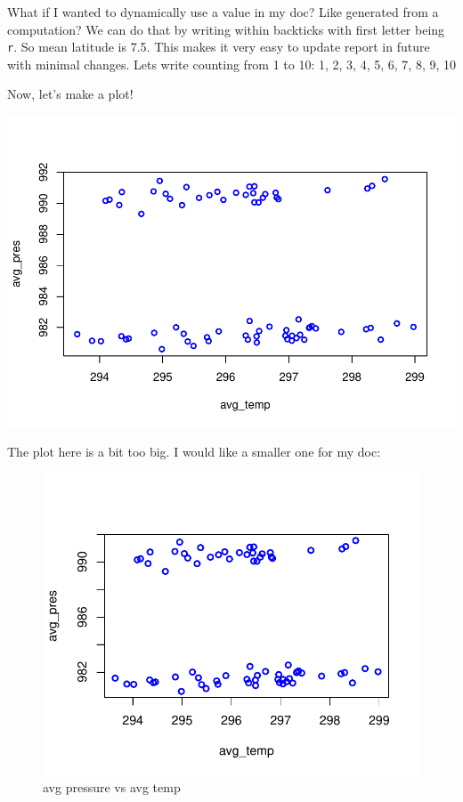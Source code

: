 \documentclass[12pt,]{article}
\begin{document}
What if I wanted to dynamically use a value in my doc? Like generated
from a computation? We can do that by writing within backticks with
first letter being \texttt{r}. So mean latitude is 7.5. This makes it
very easy to update report in future with minimal changes. Lets write
counting from 1 to 10: 1, 2, 3, 4, 5, 6, 7, 8, 9, 10

Now, let's make a plot!

\includegraphics{first_doc_files/figure-latex/unnamed-chunk-4-1.pdf}

The plot here is a bit too big. I would like a smaller one for my doc:

\begin{figure}[htbp]
\centering
\includegraphics{first_doc_files/figure-latex/unnamed-chunk-5-1.pdf}
\caption{avg pressure vs avg temp}
\end{figure}
\end{document}
